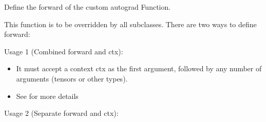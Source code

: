 \documentclass[letterpaper,10pt,english]{sphinxmanual}
\begin{document}
\begin{fulllineitems}
\begin{fulllineitems}
\label{\detokenize{dtw_loss_functions.soft_dtw_implementations.soft_dtw_cuda_ron.autograd_xy:dtw_loss_functions.soft_dtw_implementations.soft_dtw_cuda_ron.autograd_xy.SoftDTWXYAutograd.forward}}
\pysigstartsignatures
\pysiglinewithargsret
{}
{\sphinxparamcomma {}\sphinxparamcomma {}\sphinxparamcomma {}\sphinxparamcomma {}}
{}
\pysigstopsignatures
\sphinxAtStartPar
Define the forward of the custom autograd Function.

\sphinxAtStartPar
This function is to be overridden by all subclasses.
There are two ways to define forward:

\sphinxAtStartPar
Usage 1 (Combined forward and ctx):

\begin{sphinxVerbatim}[commandchars=\\\{\}]
       
\end{sphinxVerbatim}
\begin{itemize}
\item {} 
\sphinxAtStartPar
It must accept a context ctx as the first argument, followed by any
number of arguments (tensors or other types).

\item {} 
\sphinxAtStartPar
See  for more details

\end{itemize}

\sphinxAtStartPar
Usage 2 (Separate forward and ctx):

\begin{sphinxVerbatim}[commandchars=\\\{\}]
     


\end{sphinxVerbatim}
\end{fulllineitems}
\end{fulllineitems}
\end{document}
